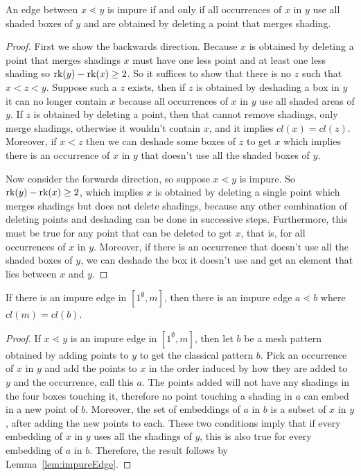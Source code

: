 \documentclass[11pt,a4paper,oneside]{article}
\begin{document}
\begin{lem}\label{lem:impureEdge}
An edge between $x\lessdot y$ is impure if and only if all occurrences of $x$ in
$y$ use all shaded boxes of $y$ and are obtained by deleting a point that merges
shading.
\begin{proof}
First we show the backwards direction. Because $x$ is obtained by deleting a
point that merges shadings $x$ must have one less point and at least one less
shading so $\operatorname{\textrm{rk}}(y)-\operatorname{\textrm{rk}}(x)\ge2$. So it suffices to show that there is no $z$ such
that $x<z<y$. Suppose such a $z$ exists, then if $z$ is obtained by deshading a
box in $y$ it can no longer contain $x$ because all occurrences of $x$ in $y$
use all shaded areas of $y$. If $z$ is obtained by deleting a point, then that
cannot remove shadings, only merge shadings, otherwise it wouldn't contain $x$,
and it implies $cl(x)=cl(z)$. Moreover, if $x<z$ then we can deshade some boxes
of $z$ to get $x$ which implies there is an occurrence of $x$ in $y$ that
doesn't use all the shaded boxes of $y$.

Now consider the forwards direction, so suppose $x\lessdot y$ is impure. So
$\operatorname{\textrm{rk}}(y)-\operatorname{\textrm{rk}}(x)\ge2$, which implies $x$ is obtained by deleting a single point
which merges shadings but does not delete shadings, because any other
combination of deleting points and deshading can be done in successive steps.
Furthermore, this must be true for any point that can be deleted to get $x$,
that is, for all occurrences of $x$ in $y$. Moreover, if there is an occurrence
that doesn't use all the shaded boxes of $y$, we can deshade the box it doesn't
use and get an element that lies between $x$ and $y$.
\end{proof}
\end{lem}

\begin{lem}\label{lem:topImpure}
If there is an impure edge in $[1^\emptyset,m]$, then there is an impure edge
$a\lessdot b$ where $cl(m)=cl(b)$.
\begin{proof}
If $x\lessdot y$ is an impure edge in $[1^\emptyset,m]$, then let $b$ be a mesh
pattern obtained by adding points to $y$ to get the classical pattern $b$. Pick
an occurrence of $x$ in $y$ and add the points to $x$ in the order induced by
how they are added to $y$ and the occurrence, call this $a$. The points added
will not have any shadings in the four boxes touching it, therefore no point
touching a shading in $a$ can embed in a new point of $b$. Moreover, the set of
embeddings of $a$ in $b$ is a subset of $x$ in $y$, after adding the new points
to each. These two conditions imply that if every embedding of $x$ in $y$ uses
all the shadings of $y$, this is also true for every embedding of $a$ in $b$.
Therefore, the result follows by Lemma~\ref{lem:impureEdge}.
\end{proof}
\end{lem}
\end{document}
